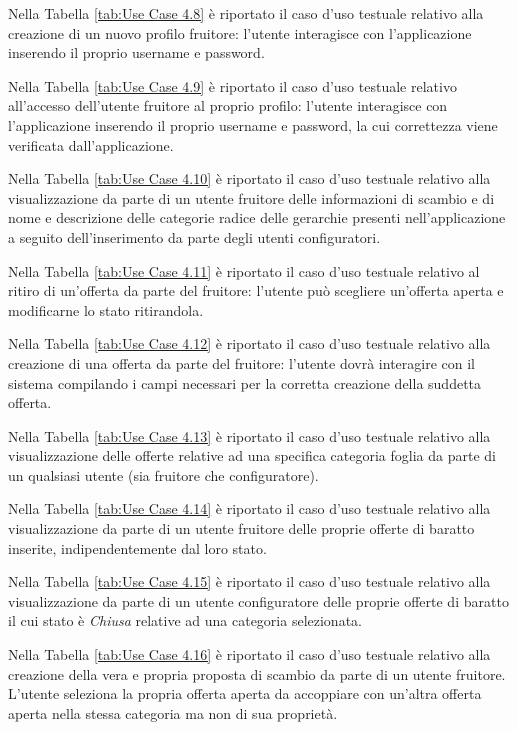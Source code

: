 Nella Tabella \ref{tab:Use Case 4.8} è riportato il caso d'uso testuale relativo alla creazione di un nuovo profilo fruitore: l'utente interagisce con l'applicazione inserendo il proprio username e password.\bigskip

Nella Tabella \ref{tab:Use Case 4.9} è riportato il caso d'uso testuale relativo all'accesso dell'utente fruitore al proprio profilo: l'utente interagisce con l'applicazione inserendo il proprio username e password, la cui correttezza viene verificata dall'applicazione.\bigskip

Nella Tabella \ref{tab:Use Case 4.10} è riportato il caso d'uso testuale relativo alla visualizzazione da parte di un utente fruitore delle informazioni di scambio e di nome e descrizione delle categorie radice delle gerarchie presenti nell'applicazione a seguito dell'inserimento da parte degli utenti configuratori.\bigskip

Nella Tabella \ref{tab:Use Case 4.11} è riportato il caso d'uso testuale relativo al ritiro di un'offerta da parte del fruitore: l'utente può scegliere un'offerta aperta e modificarne lo stato ritirandola.\bigskip

Nella Tabella \ref{tab:Use Case 4.12} è riportato il caso d'uso testuale relativo alla creazione di una offerta da parte del fruitore: l'utente dovrà interagire con il sistema compilando i campi necessari per la corretta creazione della suddetta offerta.\bigskip

Nella Tabella \ref{tab:Use Case 4.13} è riportato il caso d'uso testuale relativo alla visualizzazione delle offerte relative ad una specifica categoria foglia da parte di un qualsiasi utente (sia fruitore che configuratore).\bigskip

Nella Tabella \ref{tab:Use Case 4.14} è riportato il caso d'uso testuale relativo alla visualizzazione da parte di un utente fruitore delle proprie offerte di baratto inserite, indipendentemente dal loro stato.\bigskip

Nella Tabella \ref{tab:Use Case 4.15} è riportato il caso d'uso testuale relativo alla visualizzazione da parte di un utente configuratore delle proprie offerte di baratto il cui stato è \textit{Chiusa} relative ad una categoria selezionata.\bigskip

Nella Tabella \ref{tab:Use Case 4.16} è riportato il caso d'uso testuale relativo alla creazione della vera e propria proposta di scambio da parte di un utente fruitore. L'utente seleziona la propria offerta aperta da accoppiare con un'altra offerta aperta nella stessa categoria ma non di sua proprietà.\bigskip

